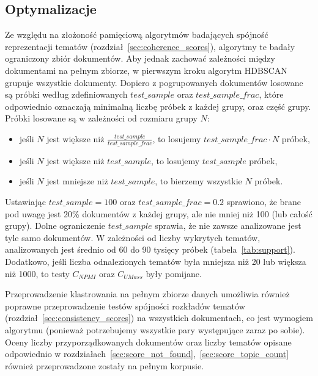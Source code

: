 	\subsection{Optymalizacje}
		Ze względu na złożoność pamięciową algorytmów badających spójność reprezentacji tematów (rozdział~\ref{sec:coherence_scores}),
			algorytmy te badały ograniczony zbiór dokumentów.
		Aby jednak zachować zależności między dokumentami na pełnym zbiorze, w pierwszym kroku algorytm HDBSCAN grupuje wszystkie dokumenty.
		Dopiero z pogrupowanych dokumentów losowane są próbki według zdefiniowanych \(test\_sample\) oraz \(test\_sample\_frac\),
			które odpowiednio oznaczają minimalną liczbę próbek z każdej grupy, oraz część grupy.
		Próbki losowane są w zależności od rozmiaru grupy \(N\):
		\begin{itemize}
			\item jeśli \(N\) jest większe niż \(\frac{test\_sample}{test\_sample\_frac}\), to losujemy \(test\_sample\_frac \cdot N\) próbek,
			\item jeśli \(N\) jest większe niż \(test\_sample\), to losujemy \(test\_sample\) próbek,
			\item jeśli \(N\) jest mniejsze niż \(test\_sample\), to bierzemy wszystkie \(N\) próbek.
		\end{itemize}
		Ustawiając \(test\_sample=100\) oraz \(test\_sample\_frac=0.2\) sprawiono,
			że brane pod uwagę jest 20\% dokumentów z każdej grupy, ale nie mniej niż 100 (lub całość grupy).
		Dolne ograniczenie \(test\_sample\) sprawia, że nie zawsze analizowane jest tyle samo dokumentów.
		W zależności od liczby wykrytych tematów, analizowanych jest średnio od 60 do 90 tysięcy próbek (tabela~\ref{tab:support}).
		Dodatkowo, jeśli liczba odnalezionych tematów była mniejsza niż 20 lub większa niż 1000, to testy \(C_{NPMI}\) oraz \(C_{UMass}\) były pomijane.

		Przeprowadzenie klastrowania na pełnym zbiorze danych umożliwia również poprawne przeprowadzenie testów spójności rozkładów tematów (rozdział~\ref{sec:consistency_scores})
			na wszystkich dokumentach, co jest wymogiem algorytmu (ponieważ potrzebujemy wszystkie pary występujące zaraz po sobie).
		Oceny liczby przyporządkowanych dokumentów oraz liczby tematów opisane odpowiednio w rozdziałach~\ref{sec:score_not_found},~\ref{sec:score_topic_count}
			również przeprowadzone zostały na pełnym korpusie.

